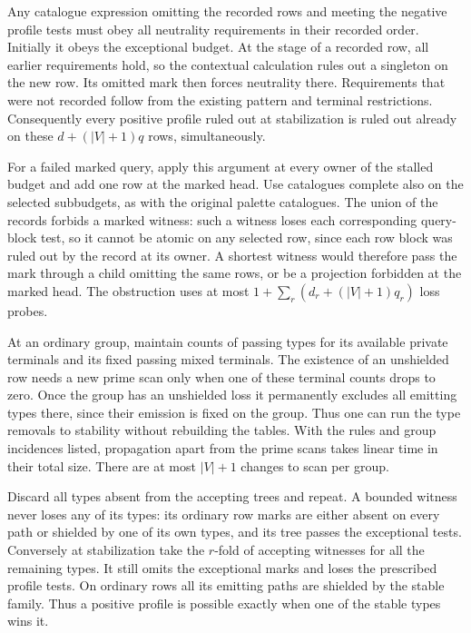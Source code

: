 Any catalogue expression omitting the recorded rows
and meeting the negative profile tests must obey all neutrality
requirements in their recorded order. Initially
it obeys the exceptional budget. At the stage of
a recorded row, all earlier requirements hold,
so the contextual calculation rules out a
singleton on the new row. Its omitted mark
then forces neutrality there. Requirements that
were not recorded follow from the existing
pattern and terminal restrictions. Consequently
every positive profile ruled out at stabilization
is ruled out already on these $d+(|V|+1)q$ rows,
simultaneously.

For a failed marked query, apply this argument at
every owner of the stalled budget and add one row
at the marked head. Use catalogues complete also
on the selected subbudgets, as with the original
palette catalogues. The union of the records
forbids a marked witness: such a witness loses
each corresponding query-block test, so it cannot
be atomic on any selected row, since each row
block was ruled out by the record at its owner.
A shortest witness would therefore pass the mark
through a child omitting the same rows, or be a
projection forbidden at the marked head. The
obstruction uses at most
$1+\sum_r(d_r+(|V|+1)q_r)$ loss probes.

At an ordinary group, maintain counts of passing
types for its available private terminals and its
fixed passing mixed terminals. The existence of an
unshielded row needs a new prime scan only when
one of these terminal counts drops to zero. Once
the group has an unshielded loss it permanently
excludes all emitting types there, since their
emission is fixed on the group. Thus one can run
the type removals to stability without rebuilding
the tables. With the rules and group incidences
listed, propagation apart from the prime scans
takes linear time in their total size. There are
at most $|V|+1$ changes to scan per group.

Discard all types absent from the accepting trees and
repeat. A bounded witness never loses any of its types:
its ordinary row marks are either absent on every path
or shielded by one of its own types, and its tree passes
the exceptional tests. Conversely at stabilization
take the $r$-fold of accepting witnesses for all the
remaining types. It still omits the exceptional marks
and loses the prescribed profile tests. On ordinary
rows all its emitting paths are shielded by the
stable family. Thus a positive profile is possible
exactly when one of the stable types wins it.

